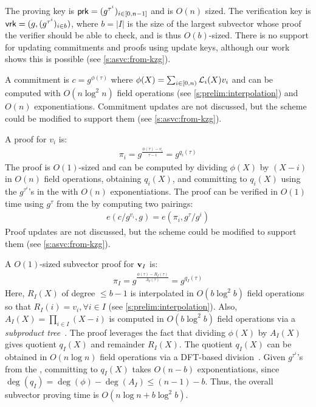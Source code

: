 The proving key is $\mathsf{prk}=(g^{\tau^i})_{i\in [0,n-1]}$ and is $O(n)$ sized.
The verification key is $\mathsf{vrk}=(g,(g^{\tau^i})_{i\in b})$, where $b=|I|$ is the size of the largest subvector whose proof the verifier should be able to check, and is thus $O(b)$-sized.
There is no support for updating commitments and proofs using update keys, although our work shows this is possible (see \cref{s:asvc:from-kzg}).

A commitment is $c=g^{\phi(\tau)}$ where $\phi(X)=\sum_{i\in [0,n)} \mathcal{L}_i(X) v_i$ and can be computed with $O(n\log^2{n})$ field operations (see \cref{s:prelim:interpolation}) and $O(n)$ exponentiations.
Commitment updates are not discussed, but the scheme could be modified to support them (see \cref{s:asvc:from-kzg}).

A proof for $v_i$ is:
\begin{align}
\pi_i = g^{\frac{\phi(\tau)-v_i}{\tau - i}} = g^{q_i(\tau)}
\end{align}
The proof is $O(1)$-sized and can be computed by dividing $\phi(X)$ by $(X-i)$ in $O(n)$ field operations, obtaining $q_i(X)$, and committing to $q_i(X)$ using the $g^{\tau^i}$'s in the \prk with $O(n)$ exponentiations.
The proof can be verified in $O(1)$ time using $g^\tau$ from the \vrk by computing two pairings:
\begin{align}
e(c/g^{v_i}, g) = e(\pi_i, g^{\tau}/g^{i})
\end{align}
Proof updates are not discussed, but the scheme could be modified to support them (see \cref{s:asvc:from-kzg}).

A $O(1)$-sized subvector proof for $\bm{\mathrm{v}}_I$ is:
\begin{align}
\pi_I=g^\frac{\phi(\tau)-R_I(\tau)}{A_I(\tau)}=g^{q_I(\tau)}
\end{align}
Here, $R_I(X)$ of degree $\le b-1$ is interpolated in $O(b\log^2{b})$ field operations so that $R_I(i) = v_i,\forall i\in I$ (see \cref{s:prelim:interpolation}).
Also, $A_I(X)= \prod_{i\in I} (X-i)$ is computed in $O(b\log^2{b})$ field operations via a \textit{subproduct tree}~\cite{vG13ModernCh10}.
The proof leverages the fact that dividing $\phi(X)$ by $A_I(X)$ gives quotient $q_I(X)$ and remainder $R_I(X)$.
The quotient $q_I(X)$ can be obtained in $O(n\log{n})$ field operations via a DFT-based division~\cite{vG13ModernCh9}.
Given $g^{\tau^i}$'s from the \prk, committing to $q_I(X)$ takes $O(n-b)$ exponentiations, since $\deg(q_I)=\deg(\phi)-\deg(A_I)\le (n-1)-b$.
Thus, the overall subvector proving time is $O(n\log{n}+b\log^2{b})$.


